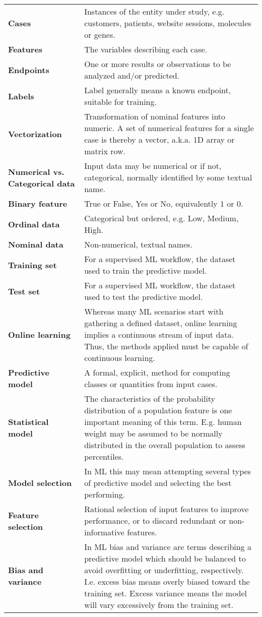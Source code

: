 \begin{appendices}
\begin{singlespace}
\begin{longtable}{p{0.3\linewidth}p{0.7\linewidth}}
\textbf{Cases} & Instances of the entity under study, e.g. customers, patients, website sessions, molecules or genes. \\
\textbf{Features} & The variables describing each case. \\
\textbf{Endpoints} & One or more results or observations to be analyzed and/or predicted. \\
\textbf{Labels} & Label generally means a known endpoint, suitable for training. \\
\textbf{Vectorization} & Transformation of nominal features into numeric.  A set of numerical features for a single case is thereby a vector, a.k.a. 1D array or matrix row. \\
\textbf{Numerical vs. Categorical data} & Input data may be numerical or if not, categorical, normally identified by some textual name. \\
\textbf{Binary feature} & True or False, Yes or No, equivalently 1 or 0. \\
\textbf{Ordinal data} & Categorical but ordered, e.g. Low, Medium, High. \\
\textbf{Nominal data} & Non-numerical, textual names. \\
\textbf{Training set} & For a supervised ML workflow, the dataset used to train the predictive model. \\
\textbf{Test set} & For a supervised ML workflow, the dataset used to test the predictive model. \\
\textbf{Online learning} & Whereas many ML scenarios start with gathering a defined dataset, online learning implies a continuous stream of input data.  Thus, the methods applied must be capable of continuous learning. \\
\textbf{Predictive model} & A formal, explicit, method for computing classes or quantities from input cases. \\
\textbf{Statistical model} & The characteristics of the probability distribution of a population feature is one important meaning of this term.  E.g. human weight may be assumed to be normally distributed in the overall population to assess percentiles. \\
\textbf{Model selection} & In ML this may mean attempting several types of predictive model and selecting the best performing. \\
\textbf{Feature selection} & Rational selection of input features to improve performance, or to discard redundant or non-informative features. \\
\textbf{Bias and variance} & In ML bias and variance are terms describing a predictive model which should be balanced to avoid overfitting or underfitting, respectively.  I.e. excess bias means overly biased toward the training set.  Excess variance means the model will vary excessively from the training set. \\

\end{longtable}
\end{singlespace}
\end{appendices}
